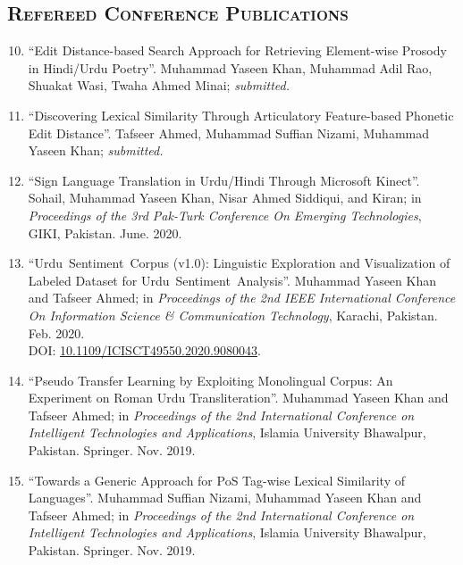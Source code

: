 \documentclass[a4paper, 10pt]{article}
\begin{document}
\subsection*{\normalfont\textsc{Refereed Conference Publications}}
\begin{enumerate}
\setcounter{enumi}{9}
\itemsep-4pt 
\item ``Edit Distance-based Search Approach for Retrieving  Element-wise Prosody in Hindi/Urdu Poetry''. \textcolor{NavyBlue}{Muhammad Yaseen Khan}, Muhammad Adil Rao, Shuakat Wasi, Twaha Ahmed Minai; \emph{\small submitted.}

\item ``Discovering Lexical Similarity Through Articulatory Feature-based Phonetic Edit Distance''. Tafseer Ahmed, Muhammad Suffian Nizami, \textcolor{NavyBlue}{Muhammad Yaseen Khan}; \emph{\small submitted.}

\item ``Sign Language Translation in Urdu/Hindi Through Microsoft Kinect''. Sohail, \textcolor{NavyBlue}{Muhammad Yaseen Khan}, Nisar Ahmed Siddiqui, and Kiran; in \emph{Proceedings of the 3rd Pak-Turk Conference On Emerging Technologies}, GIKI, Pakistan. June. 2020.

\item ``Urdu~Sentiment~Corpus (v1.0): Linguistic Exploration and Visualization of Labeled Dataset for Urdu~Sentiment~Analysis''. \textcolor{NavyBlue}{Muhammad Yaseen Khan} and Tafseer Ahmed; in \emph{Proceedings of the 2nd IEEE International Conference On Information Science \& Communication Technology}, Karachi, Pakistan. Feb. 2020.\\DOI: \href{10.1109/ICISCT49550.2020.9080043}{10.1109/ICISCT49550.2020.9080043}.

 \item ``Pseudo Transfer Learning by Exploiting Monolingual Corpus: An Experiment on Roman Urdu Transliteration''. \textcolor{NavyBlue}{Muhammad Yaseen Khan} and Tafseer Ahmed; in \emph{Proceedings of the 2nd International Conference on Intelligent Technologies and Applications}, Islamia University Bhawalpur, Pakistan. Springer. Nov. 2019.
 
  \item ``Towards a Generic Approach for PoS Tag-wise Lexical Similarity of Languages''. Muhammad Suffian Nizami, \textcolor{NavyBlue}{Muhammad Yaseen Khan} and Tafseer Ahmed; in \emph{Proceedings of the 2nd International Conference on Intelligent Technologies and Applications}, Islamia University Bhawalpur, Pakistan. Springer. Nov. 2019.
  

\end{enumerate}
\end{document}
